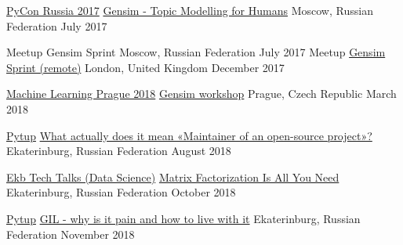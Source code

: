 

\begin{cventries}

  \cventry
    {\href{http://pycon.ru/2017/en/}{PyCon Russia 2017}} %
    {\href{http://pycon.ru/2017/en/program/content/menshih/}{Gensim - Topic Modelling for Humans}} %
    {Moscow, Russian Federation} %
    {July 2017} %
    {
    }

  \cventry
    {Meetup} %
    {Gensim Sprint} %
    {Moscow, Russian Federation} %
    {July 2017} %
    {
    }
  \cventry
    {Meetup} %
    {\href{https://www.meetup.com/ru-RU/Python-Sprints/events/245888885/}{Gensim Sprint (remote)}} %
    {London, United Kingdom} %
    {December 2017} %
    {
    }

  \cventry
    {\href{https://2018.mlprague.com/}{Machine Learning Prague 2018}} %
    {\href{https://github.com/RaRe-Technologies/talks/tree/master/2018-03-23_MLPrague-workshop}{Gensim workshop}} %
    {Prague, Czech Republic} %
    {March 2018} %
    {
    }

  \cventry
    {\href{https://events.yandex.ru/events/meetings/22-aug-2018/}{Pytup}} %
    {\href{https://events.yandex.ru/lib/talks/6290/}{What actually does it mean «Maintainer of an open-source project»?}} %
    {Ekaterinburg, Russian Federation} %
    {August 2018} %
    {
    }

  \cventry
    {\href{https://eventskbkontur.timepad.ru/event/834033/}{Ekb Tech Talks (Data Science)}} %
    {\href{https://slides.com/menshikh_iv/gensim_kontur#/}{Matrix Factorization Is All You Need}} %
    {Ekaterinburg, Russian Federation} %
    {October 2018} %
    {
    }

  \cventry
    {\href{https://yandex.ru/pytup/}{Pytup}} %
    {\href{https://github.com/menshikh-iv/sum_seq_bench_pytup}{GIL - why is it pain and how to live with it}} %
    {Ekaterinburg, Russian Federation} %
    {November 2018} %
    {
    }
\end{cventries}
